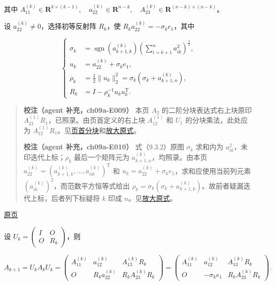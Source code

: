 \documentclass[
  10pt,
  fontset=fandol]{ctexart}
\begin{document}
其中 \(A_{11}^{(k)}\in\mathbf R^{k\times(k-1)},\allowbreak \quad a_{22}^{(k)}\in\mathbf R^{n-k},\allowbreak \quad A_{23}^{(k)}\in\mathbf R^{(n-k)\times(n-k)}\)。

设 \(a_{22}^{(k)}\ne0\)，选择初等反射阵 \(R_k\)，使 \(R_ka_{22}^{(k)}=-\sigma_ke_1\)，其中

\[
\left\{
\begin{aligned}
\sigma_k&=\operatorname{sgn}(a_{k+1,k}^{(k)})\left(\sum_{i=k+1}^na_{ik}^2\right)^{\frac12},\\
u_k&=a_{22}^{(k)}+\sigma_ke_1,\\
\rho_k&=\frac12\|u_k\|_2^2=\sigma_k(\sigma_k+a_{k+1,n}^{(k)}),\\
R_k&=I-\rho_k^{-1}u_ku_k^{\mathrm T}.
\end{aligned}
\right.
\tag{9.3.2}
\]

\begin{quote}
\textbf{校注（agent 补充，ch09a-E009）} 本页 \(A_2\) 的二阶分块表达式右上块原印 \(A_{21}^{(1)}R_1\)，已照录。由页首定义的右上块 \(A_{12}^{(1)}\) 和 \(U_1\) 的分块乘法，此处应为 \(A_{12}^{(1)}R_1\)。见\href{../assets/ch09a/review-p246-initial-partition.png}{页首分块}和\href{../assets/ch09a/review-p246-A-2.png}{放大原式}。

\textbf{校注（agent 补充，ch09a-E010）} 式（9.3.2）原图 \(\sigma_k\) 求和内为 \(a_{ik}^2\)，未印迭代上标；\(\rho_k\) 最后一个矩阵元为 \(a_{k+1,n}^{(k)}\)，均照录。由本页 \(a_{22}^{(k)}=(a_{k+1,k}^{(k)},\ldots,a_{nk}^{(k)})^{\mathrm T}\) 和 \(u_k=a_{22}^{(k)}+\sigma_ke_1\)，求和应使用当前列元素 \((a_{ik}^{(k)})^2\)，而范数平方恒等式给出 \(\rho_k=\sigma_k(\sigma_k+a_{k+1,k}^{(k)})\)。故前者疑漏迭代上标，后者列下标疑将 \(k\) 印成 \(n\)。见\href{../assets/ch09a/review-p246-9-3-2.png}{放大原式}。
\end{quote}

\href{../../source-images/pdf-247.jpeg}{原页}

设 \(U_k=\begin{pmatrix}I&O\\O&R_k\end{pmatrix}\)，则

\[
A_{k+1}=U_kA_kU_k=
\begin{pmatrix}
A_{11}^{(k)}&a_{12}^{(k)}&A_{13}^{(k)}R_k\\
O&R_ka_{22}^{(k)}&R_kA_{23}^{(k)}R_k
\end{pmatrix}
=
\begin{pmatrix}
A_{11}^{(k)}&a_{12}^{(k)}&A_{13}^{(k)}R_k\\
O&-\sigma_ke_1&R_kA_{23}^{(k)}R_k
\end{pmatrix}.
\tag{9.3.3}
\]
\end{document}
